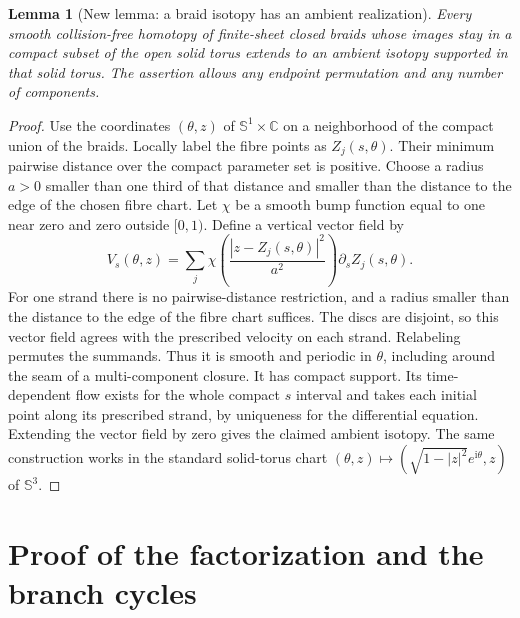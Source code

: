 \documentclass[11pt,oneside]{report}
\newtheorem{lemma}[theorem]{Lemma}
\theoremstyle{definition}
\numberwithin{equation}{section}
\newcommand{\C}{\mathbb C}
\newcommand{\ii}{\mathrm i}
\begin{document}
\begin{lemma}[New lemma: a braid isotopy has an ambient realization]
\label{J14:lem:ambient}
Every smooth collision-free homotopy of finite-sheet closed braids whose
images stay in a compact subset of the open solid torus extends to an ambient
isotopy supported in that solid torus. The assertion allows any endpoint
permutation and any number of components.
\end{lemma}
\begin{proof}
Use the coordinates $(\theta,z)$ of $\mathbb S^1\times\C$ on a neighborhood
of the compact union of the braids. Locally label the fibre points as
$Z_j(s,\theta)$. Their minimum pairwise distance over the compact parameter
set is positive. Choose a radius $a>0$ smaller than one third of that
distance and smaller than the distance to the edge of the chosen fibre
chart. Let $\chi$ be a smooth bump function equal to one near zero and zero
outside $[0,1)$. Define a vertical vector field by
\[
 V_s(\theta,z)=
 \sum_j\chi\left(\frac{|z-Z_j(s,\theta)|^2}{a^2}\right)
       \partial_s Z_j(s,\theta).
\]
For one strand there is no pairwise-distance restriction, and a radius
smaller than the distance to the edge of the fibre chart suffices.
The discs are disjoint, so this vector field agrees with the prescribed
velocity on each strand. Relabeling permutes the summands. Thus it is smooth
and periodic in $\theta$, including around the seam of a multi-component
closure. It has compact support. Its time-dependent flow exists for the
whole compact $s$ interval and takes each initial point along its prescribed
strand, by uniqueness for the differential equation. Extending the vector
field by zero gives the claimed ambient isotopy. The same construction
works in the standard solid-torus chart
$(\theta,z)\mapsto(\sqrt{1-|z|^2}e^{\ii\theta},z)$ of $\mathbb S^3$.
\end{proof}

\section{Proof of the factorization and the branch cycles}
\end{document}
